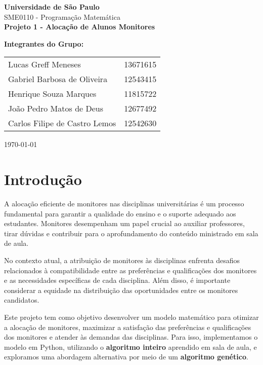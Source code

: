 \documentclass[a4paper,12pt]{article}
\begin{document}
\begin{titlepage}
    \centering
    \vfill
    {\Large \textbf{Universidade de São Paulo}}\\[1.5cm]
    {\Large SME0110 - Programação Matemática}\\[0.5cm]
    {\Huge \textbf{Projeto 1 - Alocação de Alunos Monitores}}\\[1.5cm]
    \vfill
    \begin{flushleft}
        \textbf{Integrantes do Grupo:}\\
        \vspace{0.5cm}
        \begin{tabular}{ll}
            Lucas Greff Meneses & 13671615 \\
            Gabriel Barbosa de Oliveira & 12543415 \\
            Henrique Souza Marques  & 11815722 \\
            João Pedro Matos de Deus & 12677492\\
            Carlos Filipe de Castro Lemos & 12542630 \\
        \end{tabular}
    \end{flushleft}
    \vfill
    {\large \today}
\end{titlepage}

\tableofcontents
\newpage

\section{Introdução}

A alocação eficiente de monitores nas disciplinas universitárias é um processo fundamental para garantir a qualidade do ensino e o suporte adequado aos estudantes. Monitores desempenham um papel crucial ao auxiliar professores, tirar dúvidas e contribuir para o aprofundamento do conteúdo ministrado em sala de aula.

No contexto atual, a atribuição de monitores às disciplinas enfrenta desafios relacionados à compatibilidade entre as preferências e qualificações dos monitores e as necessidades específicas de cada disciplina. Além disso, é importante considerar a equidade na distribuição das oportunidades entre os monitores candidatos.

Este projeto tem como objetivo desenvolver um modelo matemático para otimizar a alocação de monitores, maximizar a satisfação das preferências e qualificações dos monitores e atender às demandas das disciplinas. Para isso, implementamos o modelo em Python, utilizando o \textbf{algoritmo inteiro} aprendido em sala de aula, e exploramos uma abordagem alternativa por meio de um \textbf{algoritmo genético}.
\end{document}
